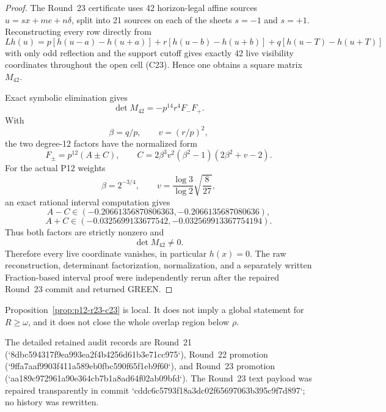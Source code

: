 \begin{proof}
The Round~23 certificate uses 42 horizon-legal affine sources
\(u=sx+me+n\delta\), split into 21 sources on each of the sheets
\(s=-1\) and \(s=+1\). Reconstructing every row directly from
\[
Lh(u)=p[h(u-a)-h(u+a)]
+r[h(u-b)-h(u+b)]
+q[h(u-T)-h(u+T)]
\]
with only odd reflection and the support cutoff gives exactly 42 live
visibility coordinates throughout the open cell (C23). Hence one obtains a
square matrix \(M_{42}\).

Exact symbolic elimination gives
\[
\det M_{42}=-p^{14}r^4F_-F_+.
\]
With
\[
\beta=q/p,
\qquad
v=(r/p)^2,
\]
the two degree-12 factors have the normalized form
\[
F_\pm=p^{12}(A\pm C),
\qquad
C=2\beta^3v^2(\beta^2-1)(2\beta^2+v-2).
\]
For the actual P12 weights
\[
\beta=2^{-3/4},
\qquad
v=\frac{\log3}{\log2}\sqrt{\frac8{27}},
\]
an exact rational interval computation gives
\[
A-C\in(-0.20661356870806363,-0.2066135687080636),
\]
\[
A+C\in(-0.0325699133677542,-0.032569913367754194).
\]
Thus both factors are strictly nonzero and
\[
\det M_{42}\ne0.
\]
Therefore every live coordinate vanishes, in particular \(h(x)=0\).
The raw reconstruction, determinant factorization, normalization, and a
separately written Fraction-based interval proof were independently rerun
after the repaired Round~23 commit and returned GREEN.
\end{proof}

\begin{remark}
Proposition~\ref{prop:p12-r23-c23} is local. It does not imply a global
statement for \(R\ge\omega\), and it does not close the whole overlap region
below \(\rho\).
\end{remark}

\begin{remark}
The detailed retained audit records are Round~21
(`8dbc594317f9ea993ea2f4b4256d61b3e71cc975`), Round~22 promotion
(`9ffa7aaf9903f411a589eb0fbc590f65f1eb9f60`), and Round~23 promotion
(`aa189c972961a90e364cb7b1a8ad64f02ab09bfd`). The Round~23 text payload was
repaired transparently in commit
`cddc6c5793f18a3dc02f65697063b395c9f7d897`; no history was rewritten.
\end{remark}
